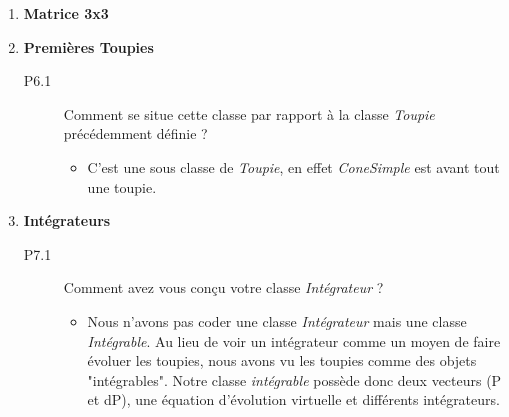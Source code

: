 \documentclass[a4paper]{article}
\begin{document}
\begin{enumerate}
		\item \textbf{Matrice 3x3}
		\\
		\item \textbf{Premières Toupies}
		
			\begin{description}
				\item[P6.1]  Comment se situe cette classe par rapport à la classe \emph{Toupie} précédemment définie ?
				
				\begin {itemize}
					\item C'est une sous classe de \emph{Toupie}, en effet \emph{ConeSimple} est avant tout une toupie.
				\end {itemize}
				
			\end{description}
		\item \textbf{Intégrateurs}
		
			\begin{description}
				\item[P7.1]  Comment avez vous conçu votre classe \emph{Intégrateur} ? 
				
				\begin {itemize}
					\item Nous n'avons pas coder une classe \emph{Intégrateur} mais une classe \emph{Intégrable}. Au lieu de voir un intégrateur comme un moyen de faire évoluer les toupies, nous avons vu les toupies comme des objets "intégrables". Notre classe \emph{intégrable} possède donc deux vecteurs (P et dP), une équation d'évolution virtuelle et différents intégrateurs.
				\end {itemize}
				

\end{description}
\end{enumerate}
\end{document}
